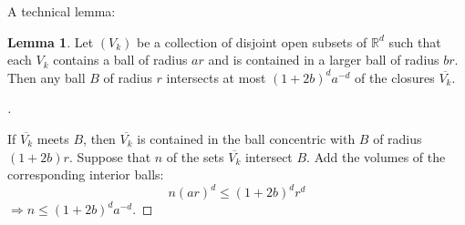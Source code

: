 \documentclass{article}
\theoremstyle{definition}
\newtheorem{lem}{Lemma}
\newenvironment{proofs}[1][\proofname]{%
  \begin{proof}[#1]$ $\par\nobreak\ignorespaces
}{%
  \end{proof}
}
\newcommand{\RR}{\mathbb R}
\newcommand{\Ra}{\Rightarrow}
\begin{document}
A technical lemma:

\begin{lem}
	Let $(V_k)$ be a collection of disjoint open subsets of $\RR^d$ such that each $V_k$ contains a ball of radius $ar$ and is contained in a larger ball of radius $br$.
	Then any ball $B$ of radius $r$ intersects at most $(1 + 2b)^d a^{-d}$ of the closures $\overline{V_k}$.
\end{lem}

\begin{proofs}
	If $\overline{V_k}$ meets $B$, then $\overline{V_k}$ is contained in the ball concentric with $B$ of radius $(1 + 2b) r$. 
	Suppose that $n$ of the sets $\overline{V_k}$ intersect $B$.
	Add the volumes of the corresponding interior balls: 
	\[
		n(ar)^d \leq (1 + 2b)^d r^d
	\]
	$\Ra n \leq (1 + 2b)^d a^{-d}$.
\end{proofs}
\end{document}
